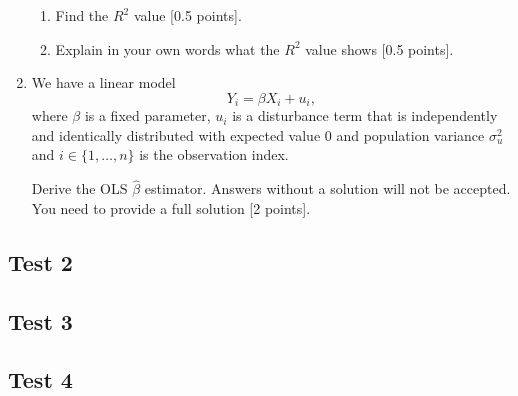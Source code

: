 \begin{enumerate}
\begin{enumerate}
    \item
    Find the $R^2$ value [0.5 points].
    
    \item
    Explain in your own words what the $R^2$ value shows [0.5 points].
    
\end{enumerate}

\item We have a linear model 
\[
    Y_i = \beta X_i + u_i,
\]
where $\beta$ is a fixed parameter, $u_i$ is a disturbance term that is independently and identically distributed with expected value 0 and population variance $\sigma_u^2$ 
and $i \in \{1, \ldots, n\}$ is the observation index.


Derive the OLS  $\hat \beta$ estimator. 
Answers without a solution will not be accepted. You need to provide a full solution [2 points].

\end{enumerate}


\subsection{Test 2}


\subsection{Test 3}


\subsection{Test 4}
